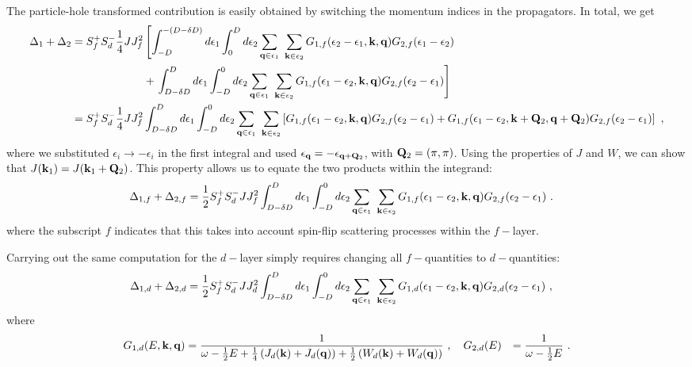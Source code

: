 \documentclass[%
reprint,
superscriptaddress,
groupedaddress,
superscriptaddress,
onecolumn,
]{revtex4-2}
\begin{document}
The particle-hole transformed contribution is easily obtained by switching the momentum indices in the propagators. In total, we get
\begin{equation}\begin{aligned}
	\Delta_{1}  + \Delta_2 = S_f^+ S_d^- \frac{1}{4}J J_f^2 &\left[\int_{-D}^{-(D - \delta D)} d\epsilon_1 \int_0^D d\epsilon_2 \sum_{{\bf q} \in \epsilon_1}~\sum_{{\bf k} \in \epsilon_2}G_{1,f}(\epsilon_2 - \epsilon_1, {\bf k}, {\bf q}) G_{2,f}(\epsilon_1 - \epsilon_2) \right.\\
															&+\left. \int_{D - \delta D}^{D} d\epsilon_1 \int_{-D}^0 d\epsilon_2 \sum_{{\bf q} \in \epsilon_1}~\sum_{{\bf k} \in \epsilon_2}G_{1,f}(\epsilon_1 - \epsilon_2, {\bf k}, {\bf q}) G_{2,f}(\epsilon_2 - \epsilon_1)\right]~\\
	=S_f^+ S_d^- \frac{1}{4}J J_f^2 &\int_{D - \delta D}^{D} d\epsilon_1 \int_{-D}^0 d\epsilon_2 \sum_{{\bf q} \in \epsilon_1}~\sum_{{\bf k} \in \epsilon_2}\left[G_{1,f}(\epsilon_1 - \epsilon_2, {\bf k}, {\bf q}) G_{2,f}(\epsilon_2 - \epsilon_1) + G_{1,f}(\epsilon_1 - \epsilon_2, {\bf k} + {\bf Q}_2, {\bf q} + {\bf Q}_2) G_{2,f}(\epsilon_2 - \epsilon_1)\right]~,
\end{aligned}\end{equation}
where we substituted \(\epsilon_i \to -\epsilon_i\) in the first integral and used \(\epsilon_{\bf q} = -\epsilon_{{\bf q} + {\bf Q}_2}\), with \({\bf Q}_2 = \left(\pi, \pi\right)\). Using the properties of \(J\) and \(W\), we can show that \(J({\bf k}_1) = J({\bf k}_1 + {\bf Q}_2)\). This property allows us to equate the two products within the integrand:
\begin{equation}\begin{aligned}
	\Delta_{1,f}  + \Delta_{2,f} = \frac{1}{2}S_f^+ S_d^- J J_f^2 &\int_{D - \delta D}^{D} d\epsilon_1 \int_{-D}^0 d\epsilon_2 \sum_{{\bf q} \in \epsilon_1}~\sum_{{\bf k} \in \epsilon_2}G_{1,f}(\epsilon_1 - \epsilon_2, {\bf k}, {\bf q}) G_{2,f}(\epsilon_2 - \epsilon_1) ~.
\end{aligned}\end{equation}
where the subscript \(f\) indicates that this takes into account spin-flip scattering processes within the \(f-\)layer.

Carrying out the same computation for the \(d-\)layer simply requires changing all \(f-\)quantities to \(d-\)quantities:
\begin{equation}\begin{aligned}
	\Delta_{1,d}  + \Delta_{2,d} = \frac{1}{2}S_f^+ S_d^- J J_d^2 &\int_{D - \delta D}^{D} d\epsilon_1 \int_{-D}^0 d\epsilon_2 \sum_{{\bf q} \in \epsilon_1}~\sum_{{\bf k} \in \epsilon_2}G_{1,d}(\epsilon_1 - \epsilon_2, {\bf k}, {\bf q}) G_{2,d}(\epsilon_2 - \epsilon_1) ~,
\end{aligned}\end{equation}
where 
\begin{equation}\begin{aligned}
	G_{1,d}(E, {\bf k}, {\bf q}) &= \frac{1}{\omega - \frac{1}{2}E + \frac{1}{4}\left(J_d({\bf k}) + J_d({\bf q})\right) + \frac{1}{2}\left(W_d({\bf k}) + W_d({\bf q})\right)}~,\quad G_{2,d}(E) &= \frac{1}{\omega - \frac{1}{2}E}~.
\end{aligned}\end{equation}
\end{document}

